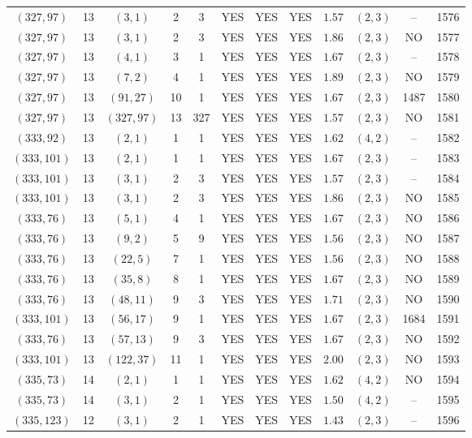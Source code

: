 \begin{longtable}{|c|c|c|c|c|c|c|c|c|c|c|c|}
$(327,97)$ & 13 & $(3,1)$ & 2 & 3 & YES & YES & YES & $1.57$ & $(2,3)$ & -- & 1576\\
$(327,97)$ & 13 & $(3,1)$ & 2 & 3 & YES & YES & YES & $1.86$ & $(2,3)$ & NO & 1577\\
$(327,97)$ & 13 & $(4,1)$ & 3 & 1 & YES & YES & YES & $1.67$ & $(2,3)$ & -- & 1578\\
$(327,97)$ & 13 & $(7,2)$ & 4 & 1 & YES & YES & YES & $1.89$ & $(2,3)$ & NO & 1579\\
$(327,97)$ & 13 & $(91,27)$ & 10 & 1 & YES & YES & YES & $1.67$ & $(2,3)$ & 1487 & 1580\\
$(327,97)$ & 13 & $(327,97)$ & 13 & 327 & YES & YES & YES & $1.57$ & $(2,3)$ & NO & 1581\\
$(333,92)$ & 13 & $(2,1)$ & 1 & 1 & YES & YES & YES & $1.62$ & $(4,2)$ & -- & 1582\\
$(333,101)$ & 13 & $(2,1)$ & 1 & 1 & YES & YES & YES & $1.67$ & $(2,3)$ & -- & 1583\\
$(333,101)$ & 13 & $(3,1)$ & 2 & 3 & YES & YES & YES & $1.57$ & $(2,3)$ & -- & 1584\\
$(333,101)$ & 13 & $(3,1)$ & 2 & 3 & YES & YES & YES & $1.86$ & $(2,3)$ & NO & 1585\\
$(333,76)$ & 13 & $(5,1)$ & 4 & 1 & YES & YES & YES & $1.67$ & $(2,3)$ & NO & 1586\\
$(333,76)$ & 13 & $(9,2)$ & 5 & 9 & YES & YES & YES & $1.56$ & $(2,3)$ & NO & 1587\\
$(333,76)$ & 13 & $(22,5)$ & 7 & 1 & YES & YES & YES & $1.56$ & $(2,3)$ & NO & 1588\\
$(333,76)$ & 13 & $(35,8)$ & 8 & 1 & YES & YES & YES & $1.67$ & $(2,3)$ & NO & 1589\\
$(333,76)$ & 13 & $(48,11)$ & 9 & 3 & YES & YES & YES & $1.71$ & $(2,3)$ & NO & 1590\\
$(333,101)$ & 13 & $(56,17)$ & 9 & 1 & YES & YES & YES & $1.67$ & $(2,3)$ & 1684 & 1591\\
$(333,76)$ & 13 & $(57,13)$ & 9 & 3 & YES & YES & YES & $1.67$ & $(2,3)$ & NO & 1592\\
$(333,101)$ & 13 & $(122,37)$ & 11 & 1 & YES & YES & YES & $2.00$ & $(2,3)$ & NO & 1593\\
$(335,73)$ & 14 & $(2,1)$ & 1 & 1 & YES & YES & YES & $1.62$ & $(4,2)$ & NO & 1594\\
$(335,73)$ & 14 & $(3,1)$ & 2 & 1 & YES & YES & YES & $1.50$ & $(4,2)$ & -- & 1595\\
$(335,123)$ & 12 & $(3,1)$ & 2 & 1 & YES & YES & YES & $1.43$ & $(2,3)$ & -- & 1596\\

\end{longtable}
